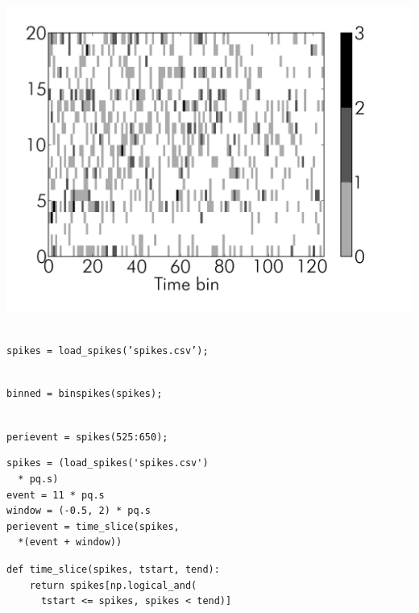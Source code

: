 \documentclass[17pt]{beamer}
\begin{document}
\begin{frame}
  \hspace*{-.055\columnwidth}
  \includegraphics[width=1.1\columnwidth]{binned-2}
\end{frame}

\begin{frame}
  \vspace{-22pt}
   \\
  \texttt{spikes = load\_spikes('spikes.csv');}
  \vspace{16pt}

   \\
  \texttt{binned = binspikes(spikes);}
  \vspace{16pt}

   \\
  \texttt{perievent = spikes(525:650);}
\end{frame}

\begin{frame}[fragile]
  \vspace{-12pt}
  \begin{verbatim}
spikes = (load_spikes('spikes.csv')
  * pq.s)
event = 11 * pq.s
window = (-0.5, 2) * pq.s
perievent = time_slice(spikes,
  *(event + window))
  \end{verbatim}
  \pause

  \begin{verbatim}
def time_slice(spikes, tstart, tend):
    return spikes[np.logical_and(
      tstart <= spikes, spikes < tend)]
  \end{verbatim}
\end{frame}
\end{document}

